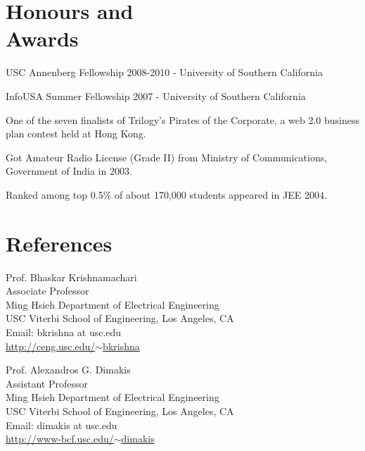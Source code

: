 \documentclass[margin,line]{resume}
\begin{document}
\begin{resume}
\section{\mysidestyle Honours and\\Awards} 
\begin{list2}
	  \item USC Annenberg Fellowship 2008-2010	- University of Southern California
          \item InfoUSA Summer Fellowship 2007	- University of Southern California %
	  \item One of the seven finalists of Trilogy's Pirates of the Corporate, a web 2.0 business plan contest held at Hong Kong. %
	  \item Got Amateur Radio License (Grade II) from Ministry of Communications, Government of India in 2003.%
	  \item Ranked among top 0.5\% of about 170,000 students appeared in JEE 2004. \\%
\end{list2}
  



\section{\mysidestyle References} 
Prof. Bhaskar Krishnamachari \\
Associate Professor \\
Ming Hsieh Department of Electrical Engineering \\
USC Viterbi School of Engineering, Los Angeles, CA \\
Email: bkrishna at usc.edu \\
\href{http://ceng.usc.edu/~bkrishna}{http://ceng.usc.edu/$\sim$bkrishna}

Prof. Alexandros G. Dimakis \\
Assistant Professor \\
Ming Hsieh Department of Electrical Engineering \\
USC Viterbi School of Engineering, Los Angeles, CA \\
Email: dimakis at usc.edu \\
\href{http://www-bcf.usc.edu/~dimakis}{http://www-bcf.usc.edu/$\sim$dimakis}

\end{resume}
\end{document}
